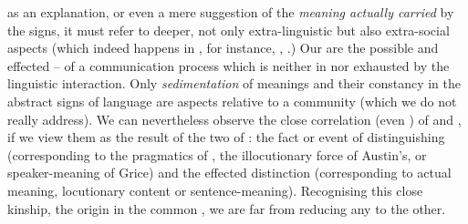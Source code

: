 {  as an explanation, or even a mere suggestion of the {\em meaning actually
    carried} by the signs, it must refer to deeper, not only extra-linguistic
  but also extra-social aspects (which indeed happens in , for instance, , .)
  Our  are the possible and effected  --
   of a communication process which is neither  in
nor exhausted by the linguistic interaction. Only {\em sedimentation} of
meanings and their constancy in the abstract signs of language are aspects
relative to a community (which we do not really address).  We can nevertheless
observe the close correlation (even \equin) of  and , if
we view them as the result of  the two  of
: the fact or event of distinguishing (corresponding to the
pragmatics of , the {illocutionary force} of Austin's, or
speaker-meaning of Grice) and the effected distinction (corresponding to actual
meaning, {locutionary content} or sentence-meaning). Recognising this close
kinship, the origin in the common \nexus, we are far from reducing any
 to the other.}

